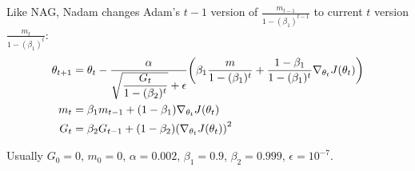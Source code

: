 Like NAG, Nadam changes Adam's $t-1$ version of $\displaystyle \frac{m_{t-1}}{1-(\beta_1)^{t-1}}$ to current $t$ version $\displaystyle \frac{m_t}{1-(\beta_1)^t}$:
\begin{equation}
    \begin{aligned}
            \theta_{t+1} &= \theta_t - \frac{\alpha}{\sqrt{\displaystyle \frac{G_t}{1-(\beta_2)^t}} + \epsilon} \mleft(\beta_1 \frac{m}{1-(\beta_1)^t} + \frac{1-\beta_1}{1-(\beta_1)^t} \nabla_{\theta_t} J(\theta_t) \mright)  \\
        m_t &= \beta_1 m_{t-1} + (1-\beta_1) \nabla_{\theta_t} J(\theta_t) \\
        G_t &= \beta_2 G_{t-1} + (1-\beta_2) \mleft(\nabla_{\theta_t} J(\theta_t) \mright)^2    
    \end{aligned}
\end{equation}

Usually $G_0 = 0$, $m_0 = 0$, $\alpha = 0.002$, $\beta_1 = 0.9$, $\beta_2 = 0.999$, $\epsilon = 10^{-7}$.





